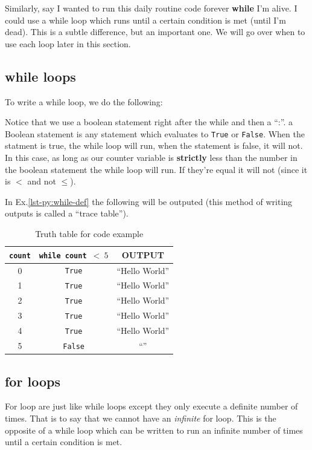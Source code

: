 \documentclass[12pt,a4paper]{book}
\begin{document}
				Similarly, say I wanted to run this daily routine code forever \textbf{while} I'm alive. I could use a while loop which runs until a certain condition is met (until I'm dead). This is a subtle difference, but an important one. We will go over when to use each loop later in this section.

				\subsection{while loops}
					To write a while loop, we do the following:
					
					Notice that we use a boolean statement right after the while and then a ``:''. a Boolean statement is any statement which evaluates to \texttt{True} or \texttt{False}. When the statment is true, the while loop will run, when the statement is false, it will not. In this case, as long as our counter variable is \textbf{strictly} less than the number in the boolean statement the while loop will run. If they're equal it will not (since it is $<$ and not $\leq$).
					
					In Ex.\ref{lst-py:while-def} the following will be outputed (this method of writing outputs is called a ``trace table'').
					\begin{table}[H]
						\centering
						\begin{tabular}{c|c|c}
							\texttt{count} & \texttt{while count $< \ 5$} & OUTPUT \\
							\hline
							0 & \texttt{True} & ``Hello World'' \\
							1 & \texttt{True} & ``Hello World'' \\
							2 & \texttt{True} & ``Hello World'' \\
							3 & \texttt{True} & ``Hello World'' \\
							4 & \texttt{True} & ``Hello World'' \\
							5 & \texttt{False} & ``''
						\end{tabular}
						\caption{Truth table for code example}
						\label{tab:while-def-tt}
					\end{table}

				\subsection{for loops}
					For loop are just like while loops except they only execute a definite number of times. That is to say that we cannot have an \textit{infinite} for loop. This is the opposite of a while loop which can be written to run an infinite number of times until a certain condition is met. 
					
\end{document}
